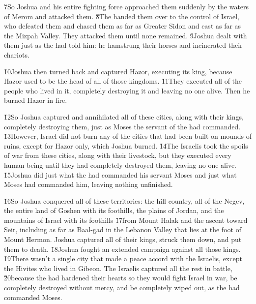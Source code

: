 \v{7}So Joshua and his entire fighting force approached them suddenly by the waters of Merom and attacked them. \v{8}The  handed them over to the control of Israel, who defeated them and chased them as far as Greater Sidon and east as far as the Mizpah Valley. They attacked them until none remained. \v{9}Joshua dealt with them just as the  had told him: he hamstrung their horses and incinerated their chariots.

\v{10}Joshua then turned back and captured Hazor, executing its king, because Hazor used to be the head of all of those kingdoms. \v{11}They executed all of the people who lived in it, completely destroying it and leaving no one alive. Then he burned Hazor in fire.

\v{12}So Joshua captured and annihilated all of these cities, along with their kings, completely destroying them, just as Moses the servant of the  had commanded. \v{13}However, Israel did not burn any of the cities that had been built on mounds of ruins, except for Hazor only, which Joshua burned. \v{14}The Israelis took the spoils of war from these cities, along with their livestock, but they executed every human being until they had completely destroyed them, leaving no one alive. \v{15}Joshua did just what the  had commanded his servant Moses and just what Moses had commanded him, leaving nothing unfinished.

\v{16}So Joshua conquered all of these territories: the hill country, all of the Negev, the entire land of Goshen with its foothills, the plains of Jordan, and the mountains of Israel with its foothills \v{17}from Mount Halak and the ascent toward Seir, including as far as Baal-gad in the Lebanon Valley that lies at the foot of Mount Hermon. Joshua captured all of their kings, struck them down, and put them to death. \v{18}Joshua fought an extended campaign against all those kings. \v{19}There wasn't a single city that made a peace accord with the Israelis, except the Hivites who lived in Gibeon. The Israelis captured all the rest in battle, \v{20}because the  had hardened their hearts so they would fight Israel in war, be completely destroyed without mercy, and be completely wiped out, as the  had commanded Moses.

